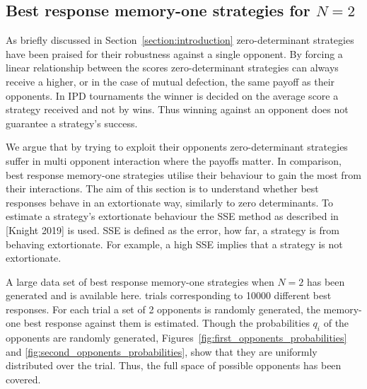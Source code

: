 \documentclass[10pt]{article}
\begin{document}
\subsection{Best response memory-one strategies for \(N=2\)}\label{subsection:best_response_n_2}

As briefly discussed in Section~\ref{section:introduction}
zero-determinant strategies have been praised for their robustness against a
single opponent. By forcing a linear relationship between the scores
zero-determinant strategies can always receive a higher, or in the case of
mutual defection, the same payoff as their opponents. In IPD tournaments the
winner is decided on the average score a strategy received and not by wins. Thus
winning against an opponent does not guarantee a strategy's success.

We argue that by trying to exploit their opponents zero-determinant strategies
suffer in multi opponent interaction where the payoffs matter. In comparison,
best response memory-one strategies utilise their behaviour to gain the most
from their interactions. The aim of this section is to understand whether best
responses behave in an extortionate way, similarly to zero determinants. To
estimate a strategy's extortionate behaviour the SSE method as described in
[Knight 2019] is used. SSE is defined as the error, how far, a strategy is from
behaving extortionate. For example, a high SSE implies that a strategy is not
extortionate.

A large data set of best response memory-one strategies when \(N=2\) has been
generated and is available here. %
trials corresponding to 10000 different best responses. For each trial a set of
2 opponents is randomly generated, the memory-one best response against them is
estimated. Though the probabilities \(q_i\) of the opponents are randomly
generated, Figures~\ref{fig:first_opponents_probabilities} and
\ref{fig:second_opponents_probabilities}, show that they are uniformly
distributed over the trial. Thus, the full space of possible opponents has been
covered.
\end{document}
